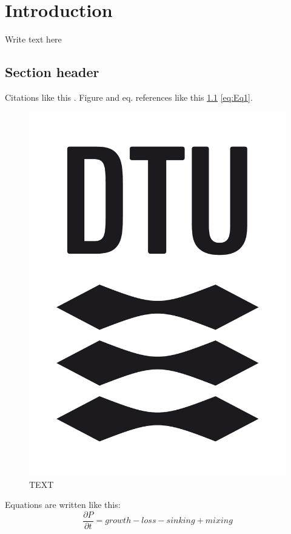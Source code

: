 \chapter{Introduction}
Write text here

\section{Section header} \label{Section}

Citations like this \cite{}.
Figure and eq. references like this \cref{fig:fig1} \cref{eq:Eq1}. 
\begin{figure}[H]
\centering
\includegraphics[width=.7\linewidth]{Pictures/Logos/black_rgb.pdf}
\caption{TEXT}
\label{fig:fig1}
\end{figure}

Equations are written like this: 
\begin{equation} \label{eq:Eq1}
    \frac{\partial P}{\partial t} = growth - loss - sinking + mixing
\end{equation}